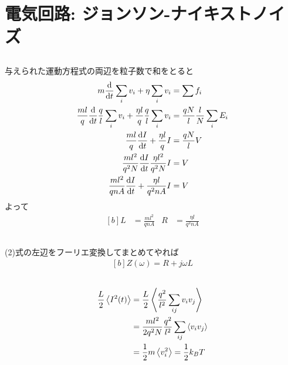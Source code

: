 \documentclass[../../master.tex]{subfiles}
\begin{document}
\clearpage
\section{電気回路: ジョンソン-ナイキストノイズ}
\subsection{}
与えられた運動方程式の両辺を粒子数で和をとると
\begin{equation}\begin{aligned}[b]
    m\dv{t}\sum_iv_i + \eta \sum_i v_i &= \sum f_i\\
    \frac{ml}{q} \dv{t}\frac{q}{l} \sum_i v_i + \frac{\eta l}{q}\frac{q}{l}\sum_i v_i &= \frac{qN}{l}\frac{l}{N}\sum_i E_i\\
    \frac{ml}{q} \dv{I}{t} + \frac{\eta l}{q}I &= \frac{qN}{l}V\\
    \frac{ml^2}{q^2N}\dv{I}{t} \frac{\eta l^2}{q^2N}I &= V\\
    \frac{ml^2}{qnA} \dv{I}{t} + \frac{\eta l}{q^2 nA} I &=V
\end{aligned}\end{equation}
よって
\begin{equation}\begin{aligned}[b]
    L &= \frac{ml^2}{qnA} &  R &= \frac{\eta l}{q^2 nA}
\end{aligned}\end{equation}

\subsection{}
(2)式の左辺をフーリエ変換してまとめてやれば
\begin{equation}\begin{aligned}[b]
    Z(\omega) = R + j\omega L
\end{aligned}\end{equation}

\subsection{}
\begin{equation}\begin{aligned}[b]
    \frac{L}{2}\ev{I^2(t)} &= \frac{L}{2} \ev{\frac{q^2}{l^2}\sum_{ij}v_iv_j}\\
    &= \frac{ml^2}{2q^2N}\frac{q^2}{l^2}\sum_{ij}\ev{v_iv_j}\\
    &= \frac{1}{2}m\ev{v_i^2} = \frac{1}{2}k_B T
\end{aligned}\end{equation}
\end{document}
